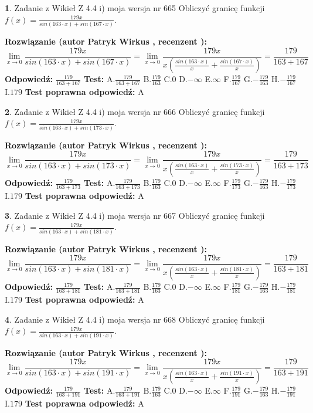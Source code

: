 \documentclass[12pt, a4paper]{article}
\theoremstyle{definition} %
\newtheorem{zad}{}
\newcommand{\zadStart}[1]{\begin{zad}#1\newline}
\newcommand{\zadStop}{\end{zad}}
\newcommand{\rozwStart}[2]{\noindent \textbf{Rozwiązanie (autor #1 , recenzent #2): }\newline}
\newcommand{\rozwStop}{\newline}
\newcommand{\odpStart}{\noindent \textbf{Odpowiedź:}\newline}
\newcommand{\odpStop}{\newline}
\newcommand{\testStart}{\noindent \textbf{Test:}\newline}
\newcommand{\testStop}{\newline}
\newcommand{\kluczStart}{\noindent \textbf{Test poprawna odpowiedź:}\newline}
\newcommand{\kluczStop}{\newline}
\begin{document}
\zadStart{Zadanie z Wikieł Z 4.4 i) moja wersja nr 665}
Obliczyć granicę funkcji $f(x)=\frac{179x}{sin(163\cdot x) +sin(167\cdot x)}$.
\zadStop
\rozwStart{Patryk Wirkus}{}
$$\lim\limits_{x\to 0}\frac{179x}{sin(163\cdot x) +sin(167\cdot x)}=\lim\limits_{x\to 0}\frac{179x}{x(\frac{sin(163\cdot x)}{x}+\frac{sin(167\cdot x)}{x})}=\frac{179}{163+167}$$
\rozwStop
\odpStart
$\frac{179}{163+167}$
\odpStop
\testStart
A.$\frac{179}{163+167}$
B.$\frac{179}{163}$
C.$0$
D.$-\infty$
E.$\infty$
F.$\frac{179}{167}$
G.$-\frac{179}{163}$
H.$-\frac{179}{167}$
I.$179$
\testStop
\kluczStart
A
\kluczStop



\zadStart{Zadanie z Wikieł Z 4.4 i) moja wersja nr 666}
Obliczyć granicę funkcji $f(x)=\frac{179x}{sin(163\cdot x) +sin(173\cdot x)}$.
\zadStop
\rozwStart{Patryk Wirkus}{}
$$\lim\limits_{x\to 0}\frac{179x}{sin(163\cdot x) +sin(173\cdot x)}=\lim\limits_{x\to 0}\frac{179x}{x(\frac{sin(163\cdot x)}{x}+\frac{sin(173\cdot x)}{x})}=\frac{179}{163+173}$$
\rozwStop
\odpStart
$\frac{179}{163+173}$
\odpStop
\testStart
A.$\frac{179}{163+173}$
B.$\frac{179}{163}$
C.$0$
D.$-\infty$
E.$\infty$
F.$\frac{179}{173}$
G.$-\frac{179}{163}$
H.$-\frac{179}{173}$
I.$179$
\testStop
\kluczStart
A
\kluczStop



\zadStart{Zadanie z Wikieł Z 4.4 i) moja wersja nr 667}
Obliczyć granicę funkcji $f(x)=\frac{179x}{sin(163\cdot x) +sin(181\cdot x)}$.
\zadStop
\rozwStart{Patryk Wirkus}{}
$$\lim\limits_{x\to 0}\frac{179x}{sin(163\cdot x) +sin(181\cdot x)}=\lim\limits_{x\to 0}\frac{179x}{x(\frac{sin(163\cdot x)}{x}+\frac{sin(181\cdot x)}{x})}=\frac{179}{163+181}$$
\rozwStop
\odpStart
$\frac{179}{163+181}$
\odpStop
\testStart
A.$\frac{179}{163+181}$
B.$\frac{179}{163}$
C.$0$
D.$-\infty$
E.$\infty$
F.$\frac{179}{181}$
G.$-\frac{179}{163}$
H.$-\frac{179}{181}$
I.$179$
\testStop
\kluczStart
A
\kluczStop



\zadStart{Zadanie z Wikieł Z 4.4 i) moja wersja nr 668}
Obliczyć granicę funkcji $f(x)=\frac{179x}{sin(163\cdot x) +sin(191\cdot x)}$.
\zadStop
\rozwStart{Patryk Wirkus}{}
$$\lim\limits_{x\to 0}\frac{179x}{sin(163\cdot x) +sin(191\cdot x)}=\lim\limits_{x\to 0}\frac{179x}{x(\frac{sin(163\cdot x)}{x}+\frac{sin(191\cdot x)}{x})}=\frac{179}{163+191}$$
\rozwStop
\odpStart
$\frac{179}{163+191}$
\odpStop
\testStart
A.$\frac{179}{163+191}$
B.$\frac{179}{163}$
C.$0$
D.$-\infty$
E.$\infty$
F.$\frac{179}{191}$
G.$-\frac{179}{163}$
H.$-\frac{179}{191}$
I.$179$
\testStop
\kluczStart
A
\kluczStop
\end{document}

